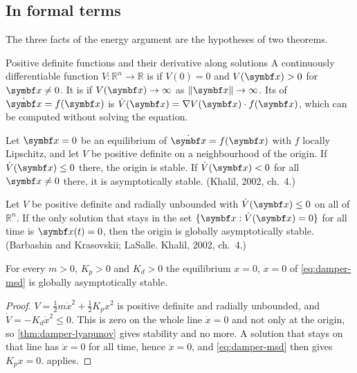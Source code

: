 \subsection{In formal terms}
The three facts of the energy argument are the hypotheses of two theorems.

\begin{definition}{Positive definite functions and their derivative along solutions}
A continuously differentiable function $V : \mathbb{R}^n \to \mathbb{R}$ is  if $V(0) = 0$ and $V(\vx) > 0$ for $\vx \ne 0$. It is  if $V(\vx) \to \infty$ as $\|\vx\| \to \infty$. Its  of $\dot{\vx} = f(\vx)$ is $\dot V(\vx) = \nabla V(\vx) \cdot f(\vx)$, which can be computed without solving the equation.
\end{definition}

\begin{theorem}
\label{thm:damper-lyapunov}
Let $\vx = 0$ be an equilibrium of $\dot{\vx} = f(\vx)$ with $f$ locally Lipschitz, and let $V$ be positive definite on a neighbourhood of the origin. If $\dot V(\vx) \le 0$ there, the origin is stable. If $\dot V(\vx) < 0$ for all $\vx \ne 0$ there, it is asymptotically stable. (Khalil, 2002, ch.~4.)
\end{theorem}

\begin{theorem}
\label{thm:damper-lasalle}
Let $V$ be positive definite and radially unbounded with $\dot V(\vx) \le 0$ on all of $\mathbb{R}^n$. If the only solution that stays in the set $\{\vx : \dot V(\vx) = 0\}$ for all time is $\vx(t) = 0$, then the origin is globally asymptotically stable. (Barbashin and Krasovskii; LaSalle. Khalil, 2002, ch.~4.)
\end{theorem}

\begin{result}
For every $m > 0$, $K_p > 0$ and $K_d > 0$ the equilibrium $x = 0$, $\dot x = 0$ of \cref{eq:damper-msd} is globally asymptotically stable.
\end{result}
\begin{proof}
$V = \tfrac12 m\dot x^2 + \tfrac12 K_p x^2$ is positive definite and radially unbounded, and $\dot V = -K_d\dot x^2 \le 0$. This is zero on the whole line $\dot x = 0$ and not only at the origin, so \cref{thm:damper-lyapunov} gives stability and no more. A solution that stays on that line has $\dot x = 0$ for all time, hence $\ddot x = 0$, and \cref{eq:damper-msd} then gives $K_p x = 0$.  applies.
\end{proof}

